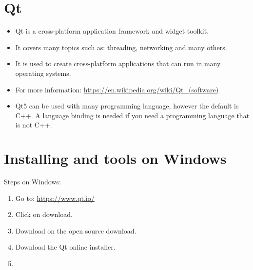 \section{Qt}
\begin{itemize}
    \item Qt is a cross-platform application framework and widget toolkit.
    \item It covers many topics such as: threading, networking and many others.
    \item It is used to create cross-platform applications that can run in many operating systems.
    \item For more information: \url{https://en.wikipedia.org/wiki/Qt_(software)}
    \item Qt5 can be used with many programming language, however the default is C++. A language binding is needed if you need a programming language that is not C++.
\end{itemize}

\section{Installing and tools on Windows}
Steps on Windows:
\begin{enumerate}
    \item Go to: \url{https://www.qt.io/}
    \item Click on download.
    \item Download on the open source download.
    \item Download the Qt online installer.
    \item 
\end{enumerate}
